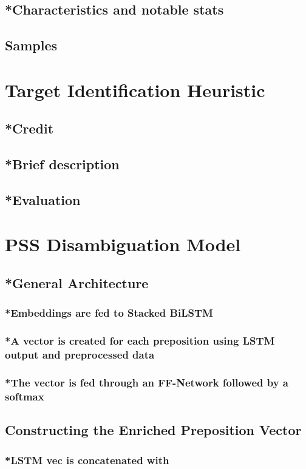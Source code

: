 \subsection{*Characteristics and notable stats}
\subsection{Samples}

\section{Target Identification Heuristic}
\subsection{*Credit}
\subsection{*Brief description}
\subsection{*Evaluation}

\section{PSS Disambiguation Model}
\subsection{*General Architecture}
\subsubsection{*Embeddings are fed to Stacked BiLSTM}
\subsubsection{*A vector is created for each preposition using LSTM output and preprocessed data}
\subsubsection{*The vector is fed through an FF-Network followed by a softmax}

\subsection{Constructing the Enriched Preposition Vector}
\subsubsection{*LSTM vec is concatenated with}
